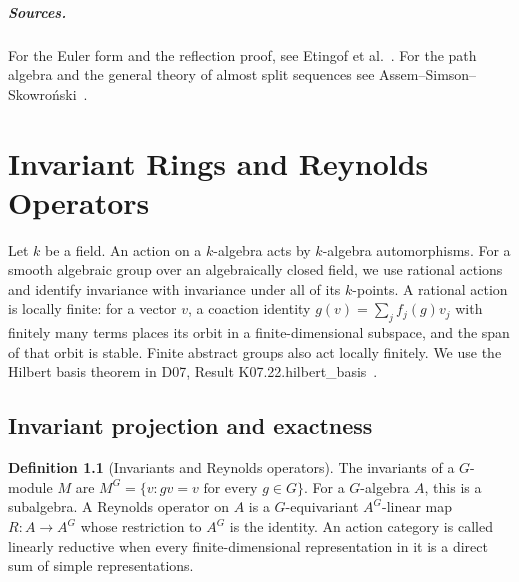 \documentclass[11pt,oneside,openany]{book}
\theoremstyle{definition}
\newtheorem{definition}[theorem]{Definition}
\theoremstyle{remark}
\begin{document}
\paragraph{Sources.}
For the Euler form and the reflection proof, see
Etingof et al.~\cite[Sections 5.4--5.8]{etingof-rep}.
For the path algebra and the general theory of almost split
sequences see Assem--Simson--Skowro\'nski~\cite[Chapters II and IV]{assem}.
\chapter{Invariant Rings and Reynolds Operators}

Let \(k\) be a field. An action on a \(k\)-algebra acts by
\(k\)-algebra automorphisms. For a smooth algebraic group over an
algebraically closed field, we use rational actions and identify
invariance with invariance under all of its \(k\)-points. A
rational action is locally finite: for a vector \(v\), a
coaction identity \(g(v)=\sum_j f_j(g)v_j\) with finitely many
terms places its orbit in a finite-dimensional subspace, and
the span of that orbit is stable. Finite abstract groups also
act locally finitely. We use the Hilbert basis theorem in D07,
Result K07.22.hilbert\_basis~\cite[Section 23.11, PDF p.~191]{mg-d07}.

\section{Invariant projection and exactness}

\begin{definition}[Invariants and Reynolds operators]
\label{res:IN01}
The invariants of a \(G\)-module \(M\) are \(M^G=\{v:gv=v
\text{ for every }g\in G\}\). For a \(G\)-algebra \(A\), this is
a subalgebra. A Reynolds operator on \(A\) is a \(G\)-equivariant
\(A^G\)-linear map \(R:A\to A^G\) whose restriction to \(A^G\)
is the identity. An action category is called linearly reductive
when every finite-dimensional representation in it is a direct
sum of simple representations.
\end{definition}
\end{document}
